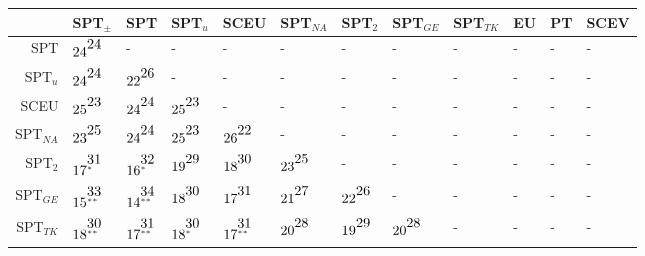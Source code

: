 \documentclass[a4paper]{article}\usepackage[]{graphicx}\usepackage[]{color}
\renewcommand{\tabcolsep}{3pt}
\renewenvironment{table*}[1][1]{
  \begin{table}[#1]\footnotesize
    \begin{adjustwidth}{-1cm}{}
    }{
    \end{adjustwidth}
  \end{table}}
\begin{document}
\begin{table*}[!htb]
\centering
\begin{tabular}{rlllllllllll}
  \hline
 & SPT$_{\pm}$ & SPT & SPT$_{u}$ & SCEU & SPT$_{NA}$ & SPT$_{2}$ & SPT$_{GE}$ & SPT$_{TK}$ & EU & PT & SCEV \\ 
  \hline
SPT & $24^{\stackrel{\textstyle24\hfill}{\scriptscriptstyle\hfill}}$ & - & - & - & - & - & - & - & - & - & - \\ 
  SPT$_{u}$ & $24^{\stackrel{\textstyle24\hfill}{\scriptscriptstyle\hfill}}$ & $22^{\stackrel{\textstyle26\hfill}{\scriptscriptstyle\hfill}}$ & - & - & - & - & - & - & - & - & - \\ 
  SCEU & $25^{\stackrel{\textstyle23\hfill}{\scriptscriptstyle\hfill}}$ & $24^{\stackrel{\textstyle24\hfill}{\scriptscriptstyle\hfill}}$ & $25^{\stackrel{\textstyle23\hfill}{\scriptscriptstyle\hfill}}$ & - & - & - & - & - & - & - & - \\ 
  SPT$_{NA}$ & $23^{\stackrel{\textstyle25\hfill}{\scriptscriptstyle\hfill}}$ & $24^{\stackrel{\textstyle24\hfill}{\scriptscriptstyle\hfill}}$ & $25^{\stackrel{\textstyle23\hfill}{\scriptscriptstyle\hfill}}$ & $26^{\stackrel{\textstyle22\hfill}{\scriptscriptstyle\hfill}}$ & - & - & - & - & - & - & - \\ 
  SPT$_{2}$ & $17^{\stackrel{\textstyle31\hfill}{\scriptscriptstyle*\hfill}}$ & $16^{\stackrel{\textstyle32\hfill}{\scriptscriptstyle*\hfill}}$ & $19^{\stackrel{\textstyle29\hfill}{\scriptscriptstyle\hfill}}$ & $18^{\stackrel{\textstyle30\hfill}{\scriptscriptstyle\hfill}}$ & $23^{\stackrel{\textstyle25\hfill}{\scriptscriptstyle\hfill}}$ & - & - & - & - & - & - \\ 
  SPT$_{GE}$ & $15^{\stackrel{\textstyle33\hfill}{\scriptscriptstyle**\hfill}}$ & $14^{\stackrel{\textstyle34\hfill}{\scriptscriptstyle**\hfill}}$ & $18^{\stackrel{\textstyle30\hfill}{\scriptscriptstyle\hfill}}$ & $17^{\stackrel{\textstyle31\hfill}{\scriptscriptstyle\hfill}}$ & $21^{\stackrel{\textstyle27\hfill}{\scriptscriptstyle\hfill}}$ & $22^{\stackrel{\textstyle26\hfill}{\scriptscriptstyle\hfill}}$ & - & - & - & - & - \\ 
  SPT$_{TK}$ & $18^{\stackrel{\textstyle30\hfill}{\scriptscriptstyle**\hfill}}$ & $17^{\stackrel{\textstyle31\hfill}{\scriptscriptstyle**\hfill}}$ & $18^{\stackrel{\textstyle30\hfill}{\scriptscriptstyle*\hfill}}$ & $17^{\stackrel{\textstyle31\hfill}{\scriptscriptstyle**\hfill}}$ & $20^{\stackrel{\textstyle28\hfill}{\scriptscriptstyle\hfill}}$ & $19^{\stackrel{\textstyle29\hfill}{\scriptscriptstyle\hfill}}$ & $20^{\stackrel{\textstyle28\hfill}{\scriptscriptstyle\hfill}}$ & - & - & - & - \\ 

\end{tabular}
\end{table*}
\end{document}
